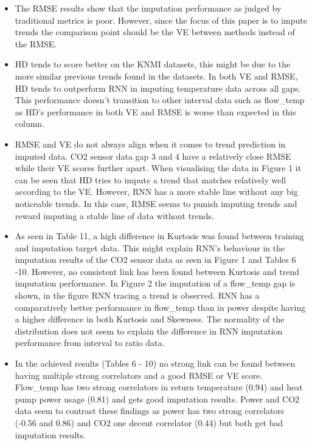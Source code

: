 \documentclass[9.5pt,article,twocolumn]{article}
\begin{document}
\begin{itemize}
    \item The RMSE results show that the imputation performance as judged by traditional metrics is poor. However, since the focus of this paper is to impute trends the comparison point should be the VE between methods instead of the RMSE. 
\end{itemize}

\begin{itemize}
    \item HD tends to score better on the KNMI datasets, this might be due to the more similar previous trends found in the datasets. In both VE and RMSE, HD tends to outperform RNN in imputing temperature data across all gaps. This performance doesn’t transition to other interval data such as flow\_temp as HD’s performance in both VE and RMSE is worse than expected in this column.
    \item RMSE and VE do not always align when it comes to trend prediction in imputed data. CO2 sensor data gap 3 and 4 have a relatively close RMSE while their VE scores further apart. When visualising the data in Figure 1 it can be seen that HD tries to impute a trend that matches relatively well according to the VE. However, RNN has a more stable line without any big noticeable trends. In this case, RMSE seems to punish imputing trends and reward imputing a stable line of data without trends. 
    \item As seen in Table 11, a high difference in Kurtosis was found between training and imputation target data. This might explain RNN’s behaviour in the imputation results of the CO2 sensor data as seen in Figure 1 and Tables 6 -10. However, no consistent link has been found between Kurtosis and trend imputation performance. In Figure 2 the imputation of a flow\_temp gap is shown, in the figure RNN tracing a trend is observed. RNN has a comparatively better performance in flow\_temp than in power despite having a higher difference in both Kurtosis and Skewness. The normality of the distribution does not seem to explain the difference in RNN imputation performance from interval to ratio data. 
\end{itemize}
\begin{itemize}
    \item In the achieved results (Tables 6 - 10) no strong link can be found between having multiple strong correlators and a good RMSE or VE score. Flow\_temp has two strong correlators in return temperature (0.94) and heat pump power usage (0.81) and gets good imputation results. Power and CO2 data seem to contrast these findings as power has two strong correlators (-0.56 and 0.86) and CO2 one decent correlator (0.44) but both get bad imputation results.
\end{itemize}
\end{document}
